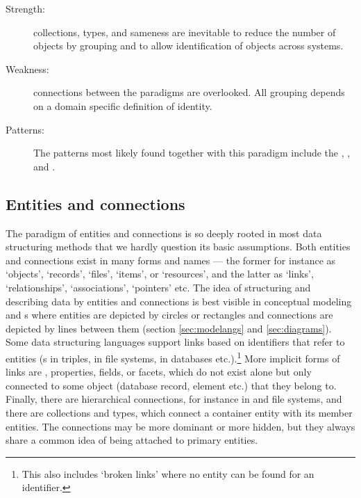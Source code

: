 \begin{description}
\item[Strength:] collections, types, and sameness are inevitable to reduce 
 the number of objects by grouping and to allow identification of objects
 across systems.
\item[Weakness:] connections between the paradigms are overlooked. All
  grouping depends on a domain specific definition of identity.
\item[Patterns:] The patterns most likely found together with
  this paradigm include the , ,
  and .
\end{description}


\subsection{Entities and connections}
\label{sec:entcon}

The paradigm of entities and connections is so deeply rooted in most data
structuring methods that we hardly question its basic assumptions. Both
entities and connections exist in many forms and names --- the former for
instance as `objects', `records', `files', `items', or `resources', and the
latter as `links', `relationships', `associations', `pointers' etc.  The idea
of structuring and describing data by entities and connections is best visible
in conceptual modeling and s where entities are
depicted by circles or rectangles and connections are depicted by lines between
them (section \ref{sec:modelangs} and \ref{sec:diagrams}). Some data
structuring languages support links based on identifiers that refer to entities
(s in  triples,  in file systems,
 in databases etc.).\footnote{This also includes `broken
links' where no entity can be found for an identifier.} More implicit forms of
links are , properties, fields, or facets, which do not exist
alone but only connected to some object (database record,  element
etc.) that they belong to. Finally, there are hierarchical connections, for
instance in  and file systems, and there are collections and types,
which connect a container entity with its member entities. The connections may
be more dominant or more hidden, but they always share a common idea of being
attached to primary entities.


